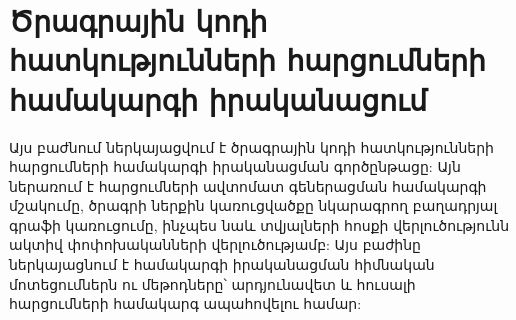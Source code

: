 {
	\section{Ծրագրային կոդի հատկությունների հարցումների համակարգի իրականացում}\label{sec:queryEngineImplementation}
	Այս բաժնում ներկայացվում է ծրագրային կոդի հատկությունների հարցումների համակարգի իրականացման գործընթացը:
	Այն ներառում է հարցումների ավտոմատ գեներացման համակարգի մշակումը, ծրագրի ներքին կառուցվածքը նկարագրող բաղադրյալ
	գրաֆի կառուցումը, ինչպես նաև տվյալների հոսքի վերլուծությունն ակտիվ փոփոխականների վերլուծությամբ: Այս
	բաժինը ներկայացնում է համակարգի իրականացման հիմնական մոտեցումներն ու մեթոդները՝ արդյունավետ
	և հուսալի հարցումների համակարգ ապահովելու համար:

	

	
}
